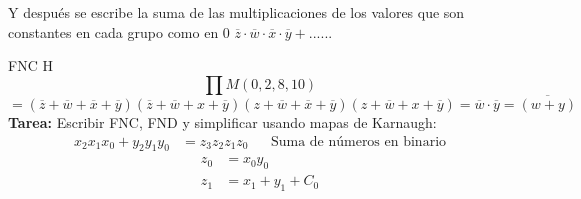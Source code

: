 \documentclass[../main.tex]{subfiles}
\begin{document}
Y después se escribe la suma de las multiplicaciones de los valores que son constantes en cada grupo
como en $0$ $\overline{z}\cdot\overline{w}\cdot\overline{x}\cdot\overline{y}+ ......$

FNC H
{
	\Huge\[\prod M (0,2,8,10)\]
}
\[
	=(\overline{z}+\overline{w}+\overline{x}+\overline{y})
	(\overline{z}+\overline{w}+x+\overline{y})
	(z+\overline{w}+\overline{x}+\overline{y})
	(z+\overline{w}+x+\overline{y})
	=\overline{w}\cdot\overline{y}
	=\overline{(w+y)}
\]
\textbf{Tarea:}
Escribir FNC, FND y simplificar usando mapas de Karnaugh:
\begin{align*}
	x_2x_1x_0+y_2y_1y_0 &= z_3z_2z_1z_0 && \text{Suma de números en binario}
\end{align*}
\begin{align*}
	z_0 &= x_0 y_0\\
	z_1 &= x_1+y_1+C_0
\end{align*}
\end{document}
